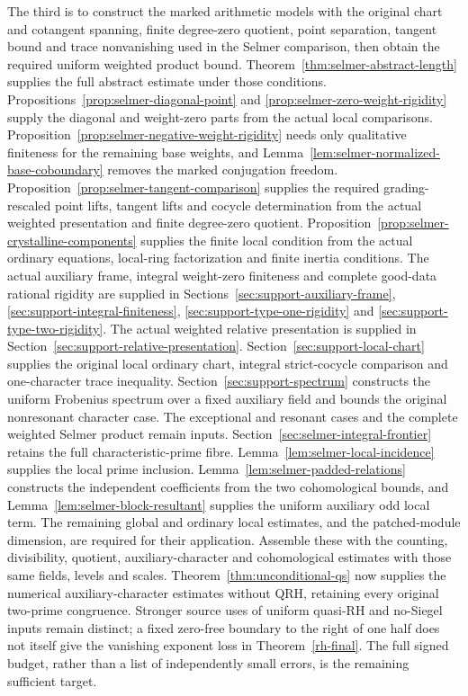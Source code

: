 The third is to construct the marked arithmetic models with the original
chart and cotangent spanning, finite degree-zero quotient, point
separation, tangent bound and trace nonvanishing used in the Selmer
comparison, then obtain the required uniform weighted product bound.
Theorem~\ref{thm:selmer-abstract-length} supplies the full abstract
estimate under those conditions. Propositions~\ref{prop:selmer-diagonal-point}
and \ref{prop:selmer-zero-weight-rigidity} supply the diagonal and
weight-zero parts from the actual local comparisons.
Proposition~\ref{prop:selmer-negative-weight-rigidity} needs only
qualitative finiteness for the remaining base weights, and
Lemma~\ref{lem:selmer-normalized-base-coboundary} removes the marked
conjugation freedom. Proposition~\ref{prop:selmer-tangent-comparison}
supplies the required grading-rescaled point lifts, tangent lifts and
cocycle determination from the actual weighted presentation and finite
degree-zero quotient. Proposition~\ref{prop:selmer-crystalline-components}
supplies the finite local condition from the actual ordinary equations,
local-ring factorization and finite inertia conditions. The actual
auxiliary frame, integral weight-zero finiteness and complete good-data
rational rigidity are supplied in Sections~\ref{sec:support-auxiliary-frame},
\ref{sec:support-integral-finiteness},
\ref{sec:support-type-one-rigidity} and
\ref{sec:support-type-two-rigidity}. The actual weighted relative
presentation is supplied in Section~\ref{sec:support-relative-presentation}.
Section~\ref{sec:support-local-chart} supplies the original local
ordinary chart, integral strict-cocycle comparison and one-character
trace inequality. Section~\ref{sec:support-spectrum} constructs the
uniform Frobenius spectrum over a fixed auxiliary field and bounds
the original nonresonant character case. The exceptional and resonant
cases and the complete weighted Selmer product remain inputs.
Section~\ref{sec:selmer-integral-frontier} retains the full
characteristic-prime fibre. Lemma~\ref{lem:selmer-local-incidence}
supplies the local prime inclusion. Lemma~\ref{lem:selmer-padded-relations}
constructs the independent coefficients from the two cohomological bounds,
and Lemma~\ref{lem:selmer-block-resultant} supplies the uniform auxiliary
odd local term. The remaining global and ordinary local estimates, and
the patched-module dimension, are required for their application.
Assemble these with the counting, divisibility,
quotient, auxiliary-character and cohomological estimates with those
same fields, levels and scales. Theorem~\ref{thm:unconditional-qs}
now supplies the numerical auxiliary-character estimates without QRH,
retaining every original two-prime congruence. Stronger source uses
of uniform quasi-RH and no-Siegel inputs \cite{rh-qrh,rh-siegel}
remain distinct; a fixed zero-free boundary to the right of
one half does not itself give the vanishing exponent loss in
Theorem~\ref{rh-final}. The full signed budget, rather than a list
of independently small errors, is the remaining sufficient target.

